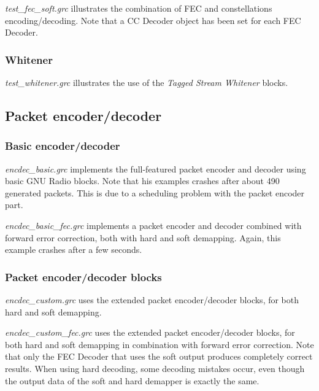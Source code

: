 \textit{test\_fec\_soft.grc} illustrates the combination of FEC and constellations encoding/decoding. Note that a CC Decoder object has been set for each FEC Decoder.

\subsubsection*{Whitener}
\textit{test\_whitener.grc} illustrates the use of the \textit{Tagged Stream Whitener} blocks.











\subsection{Packet encoder/decoder}
\subsubsection*{Basic encoder/decoder}
\textit{encdec\_basic.grc} implements the full-featured packet encoder and decoder using basic GNU Radio blocks. Note that his examples crashes after about 490 generated packets. This is due to a scheduling problem with the packet encoder part. \medskip

\textit{encdec\_basic\_fec.grc} implements a packet encoder and decoder combined with forward error correction, both with hard and soft demapping. Again, this example crashes after a few seconds.


\subsubsection*{Packet encoder/decoder blocks }
\textit{encdec\_custom.grc} uses the extended packet encoder/decoder blocks, for both hard and soft demapping. \medskip


\textit{encdec\_custom\_fec.grc} uses the extended packet encoder/decoder blocks, for both hard and soft demapping in combination with forward error correction. Note that only the FEC Decoder that uses the soft output produces completely correct results. When using hard decoding, some decoding mistakes occur, even though the output data of the soft and hard demapper is exactly the same.

